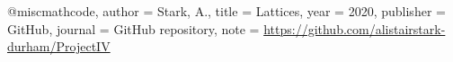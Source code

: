 @misc{mathcode,
  author = {Stark, A.},
  title = {Lattices},
  year = {2020},
  publisher = {GitHub},
  journal = {GitHub repository},
  note = {\url{https://github.com/alistairstark-durham/ProjectIV}}
}